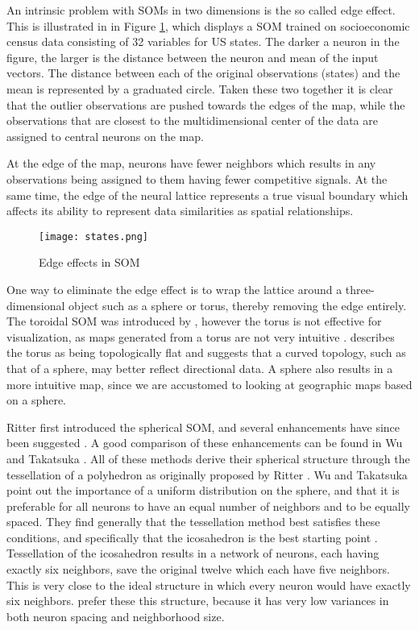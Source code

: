 
An intrinsic problem with SOMs in two dimensions is the so called edge
effect. This is illustrated in  in Figure \ref{f:edge}, which displays a SOM
trained on socioeconomic census data consisting of 32 variables for US states.
The darker a neuron in the figure, the larger is the distance between the
 neuron and mean of the input vectors. The distance between each of the
 original observations (states) and the mean is represented by a graduated
 circle. Taken these two together it is clear that the outlier observations
 are pushed towards the edges of the map, while the observations that are
 closest to the multidimensional center of the data are assigned to central
 neurons on the map.

At the edge of the map, neurons have fewer neighbors which results in any
observations being assigned to them having fewer competitive signals. At the
same time, the edge of the neural lattice represents a true visual boundary
which affects its ability to represent data similarities as spatial
relationships.

\begin{figure}
  \begin{center}
\caption{Edge effects in SOM}\label{f:edge}
  \texttt{[image: states.png]}
\end{center}
\end{figure}

One way to eliminate the edge effect is to wrap the lattice around a
three-dimensional object such as a sphere or torus, thereby removing the edge
entirely. The toroidal SOM was introduced by \cite{li1993}, however the torus
is not effective for visualization, as maps generated from a torus are not
very intuitive \cite{ito2000,wu2006}.  \cite{ritter99} describes the torus as
being topologically flat and suggests that a curved topology, such as that of
a sphere, may better reflect directional data.  A sphere also results in a
more intuitive map, since we are accustomed to looking at geographic maps
based on a sphere.  

\label{bg:sphere}
Ritter \cite{ritter99} first introduced the spherical SOM, and several enhancements have
since been suggested \cite{boudjemai2003,sangole03,Nishio:2006fk,wu2006}.  A
good comparison of these enhancements can be found in Wu and Takatsuka
 \cite{wu2006}.  All of
these methods derive their spherical structure through the tessellation of a
polyhedron as originally proposed by Ritter \cite{ritter99}.  Wu and Takatsuka \cite{wu2006} point
out the importance of a uniform distribution on the sphere, and that it is
preferable for all neurons to have an equal number of neighbors and to be
equally spaced.  They find generally that the tessellation method best satisfies
these conditions, and specifically that the icosahedron is the best starting
point \cite{wu2005}. Tessellation of the icosahedron results in a network of
neurons, each having exactly six neighbors, save the original twelve
which each have five neighbors.  This is very close to the ideal structure in
which every neuron would have exactly six neighbors.  \cite{wu2006} prefer
these this structure, because it has very low variances in both neuron spacing
and neighborhood size. 

